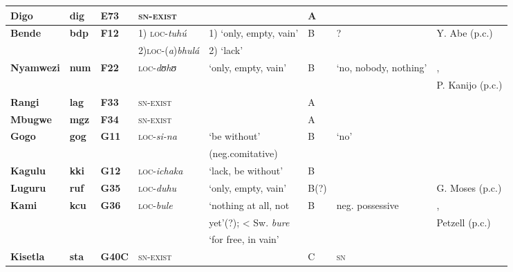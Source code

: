 \documentclass[output=paper]{langscibook}
\begin{document}
\begin{sidewaystable}[p]%
\begin{scriptsize}
\begin{tabularx}{\textwidth}{llllllll}
\lsptoprule
\textbf{Digo}		&\textbf{dig}		&\textbf{E73}	&\textsc{sn-exist}	&\textendash								&A{}	&\textendash										&\citet{Nicolle2013}\\\midrule
\textbf{Bende} 	&\textbf{bdp} 	&\textbf{F12} 	&1) \textsc{loc}-\textit{tuh\'u}&1) `only, empty, vain'			&B{}	&?												&Y. Abe (p.c.)\\
				&				&				&2)\textsc{loc}-(\textit{a})\textit{bhul\'a}&2) `lack'\\\midrule
\textbf{Nyamwezi}&\textbf{num}	&\textbf{F22}	&\textsc{loc}-\textit{dʊhʊ}&‘only, empty, vain'				&B{}	&`no, nobody, nothing'							&\citet{MagangaSchadeberg1992},\\
				&				&				&				&										&		&												&P. Kanijo (p.c.)\\\midrule
\textbf{Rangi} 	&\textbf{lag}		&\textbf{F33}	&\textsc{sn-exist}	&\textendash								&A{}	&												&\citet{Gibson2012,Dunham2005}\\\midrule
\textbf{Mbugwe} 	&\textbf{mgz} 	&\textbf{F34}	&\textsc{sn-exist}
&\textendash								&A 		&
&\citet{GibsonWilhelmsen2015}\\\midrule
\textbf{Gogo} 	&\textbf{gog} 	&\textbf{G11} 	&\textsc{loc}-\textit{si-na}&`be without'					&B{}	&`no'											&\citet{Cordell1941}\\
				&				&				&				&(neg.comitative)\\\midrule
\textbf{Kagulu} 	&\textbf{kki} 	&\textbf{G12} 	&\textsc{loc}-\textit{ichaka}&`lack, be without'				&B 		&												&\citet{Petzell2008}\\\midrule
\textbf{Luguru} 	&\textbf{ruf}		&\textbf{G35}	&\textsc{loc}-\textit{duhu}&`only, empty, vain'				&B(?) 	&												&G. Moses (p.c.)\\\midrule
\textbf{Kami}	&\textbf{kcu}	&\textbf{G36}	&\textsc{loc}-\textit{bule}&`nothing at all, not				&B{}	&neg. possessive									&\citet{PetzellAunio2016},\\
				&				&				&				&yet'(?); < Sw. \textit{bure}				&		&												&Petzell (p.c.)\\
				&				&				&				&`for free, in vain'\\\midrule
\textbf{Kisetla}	&\textbf{sta} 	&\textbf{G40C}	&\textsc{sn-exist}&\textendash								&C 		&\textsc{sn}										&\citet{Vitale1980}\\

\end{tabularx}
\end{scriptsize}
\end{sidewaystable}
\end{document}
